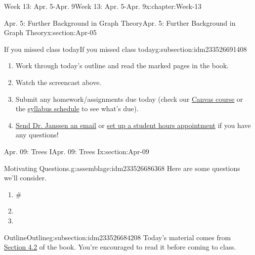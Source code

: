 \documentclass[oneside,10pt,]{book}
\numberwithin{equation}{section}
\begin{document}
\begin{chapterptx}{Week 13: Apr. 5-Apr. 9}{}{Week 13: Apr. 5-Apr. 9}{}{}{x:chapter:Week-13}
\begin{sectionptx}{Apr. 5: Further Background in Graph Theory}{}{Apr. 5: Further Background in Graph Theory}{}{}{x:section:Apr-05}
\typeout{************************************************}
%
\begin{subsectionptx}{If you missed class today}{}{If you missed class today}{}{}{g:subsection:idm233526691408}
%
\begin{enumerate}
\item{}Work through today's outline and read the marked pages in the book.%
\item{}Watch the screencast above.%
\item{}Submit any homework\slash{}assignments due today (check our \href{https://dordt.instructure.com/courses/3110050}{Canvas course} or the \href{https://prof.mkjanssen.org/ds/index.html\#schedule}{syllabus schedule} to see what's due).%
\item{}\href{mailto:mike.janssen@dordt.edu}{Send Dr. Janssen an email} or \href{https://calendly.com/mkjanssen/student-hours}{set up a student hours appointment} if you have any questions!%
\end{enumerate}
\end{subsectionptx}
\end{sectionptx}
%
%
\typeout{************************************************}
\typeout{************************************************}
%
\begin{sectionptx}{Apr. 09: Trees I}{}{Apr. 09: Trees I}{}{}{x:section:Apr-09}
\begin{introduction}{}%
\begin{assemblage}{Motivating Questions.}{g:assemblage:idm233526686368}%
Here are some questions we'll consider. %
\begin{enumerate}
\item{}\#%
\item{}%
\item{}%
\end{enumerate}
%
\end{assemblage}
\end{introduction}%
%
%
\typeout{************************************************}
\typeout{************************************************}
%
\begin{subsectionptx}{Outline}{}{Outline}{}{}{g:subsection:idm233526684208}
Today's material comes from \href{http://discrete.openmathbooks.org/dmoi3/sec_trees.html}{Section 4.2} of the book. You're encouraged to read it before coming to class.%
%
%
\typeout{************************************************}
\typeout{************************************************}

\end{subsectionptx}
\end{sectionptx}
\end{chapterptx}
\end{document}
